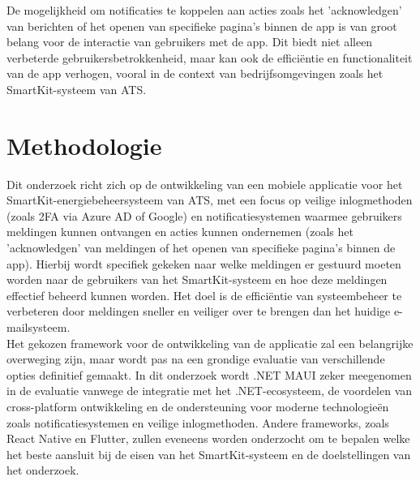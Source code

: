 \noindent De mogelijkheid om notificaties te koppelen aan acties zoals het 'acknowledgen' van berichten of het openen van specifieke pagina's binnen de app is van groot belang voor de interactie van gebruikers met de app. Dit biedt niet alleen verbeterde gebruikersbetrokkenheid, maar kan ook de efficiëntie en functionaliteit van de app verhogen, vooral in de context van bedrijfsomgevingen zoals het SmartKit-systeem van ATS.



\section{Methodologie}
\label{sec:methodologie}

\noindent Dit onderzoek richt zich op de ontwikkeling van een mobiele applicatie voor het SmartKit-energiebeheersysteem van ATS, met een focus op veilige inlogmethoden (zoals 2FA via Azure AD of Google) en notificatiesystemen waarmee gebruikers meldingen kunnen ontvangen en acties kunnen ondernemen (zoals het 'acknowledgen' van meldingen of het openen van specifieke pagina's binnen de app). Hierbij wordt specifiek gekeken naar welke meldingen er gestuurd moeten worden naar de gebruikers van het SmartKit-systeem en hoe deze meldingen effectief beheerd kunnen worden. Het doel is de efficiëntie van systeembeheer te verbeteren door meldingen sneller en veiliger over te brengen dan het huidige e-mailsysteem. \\

\noindent Het gekozen framework voor de ontwikkeling van de applicatie zal een belangrijke overweging zijn, maar wordt pas na een grondige evaluatie van verschillende opties definitief gemaakt. In dit onderzoek wordt .NET MAUI zeker meegenomen in de evaluatie vanwege de integratie met het .NET-ecosysteem, de voordelen van cross-platform ontwikkeling en de ondersteuning voor moderne technologieën zoals notificatiesystemen en veilige inlogmethoden. Andere frameworks, zoals React Native en Flutter, zullen eveneens worden onderzocht om te bepalen welke het beste aansluit bij de eisen van het SmartKit-systeem en de doelstellingen van het onderzoek.

